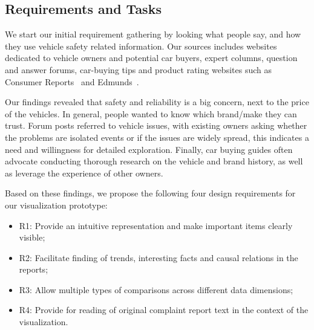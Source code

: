 \subsection{Requirements and Tasks}

We start our initial requirement gathering by looking what people say, and
how they use vehicle safety related information. Our sources includes websites 
dedicated to vehicle owners and potential car buyers, expert columns, 
question and answer forums, car-buying tips and product rating websites such 
as Consumer Reports~\cite{consumerReports} and
Edmunds~\cite{edmunds}. 


Our findings revealed that safety and reliability is a big concern, next to the
price of the vehicles. In general, people wanted to know which brand/make 
they can trust. Forum posts referred to vehicle issues, with existing owners 
asking whether the problems are isolated events or if the issues are widely
spread, this indicates a need and willingness for detailed exploration. Finally, car buying 
guides often advocate conducting thorough research on the vehicle and brand history, 
as well as leverage the experience of other owners. 
 
Based on these findings, we propose the following four design requirements for
our visualization prototype:
\begin{itemize}[noitemsep]
  \item R1: Provide an intuitive representation and make important items clearly
  visible;
  \item R2: Facilitate finding of trends, interesting facts and causal relations
  in the reports;
  \item R3: Allow multiple types of comparisons across different data
  dimensions;
  \item R4: Provide for reading of original complaint report text in the context
  of the visualization.
\end{itemize}



